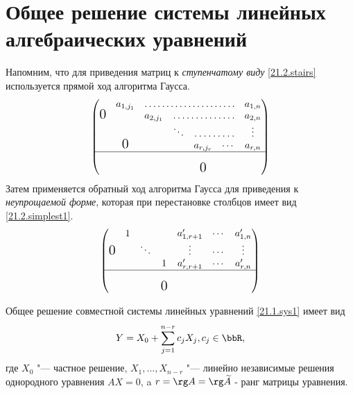 \section{Общее решение системы линейных алгебраических уравнений}
Напомним, что для приведения матриц к \textit{ступенчатому виду} \eqref{21.2.stairs} используется прямой ход алгоритма Гаусса. 
\begin{equation}\label{21.2.stairs} 
\begin{pmatrix}
  &a_{1,j_1}& \hdotsfor{4}          &a_{1,n}     \cr 
\fudge 0&&a_{2,j_1} &\hdotsfor{3}      &a_{2,n}     \cr
  &   &     &\ddots&\hdotsfor{2}    &\vdots      \cr 
  &\fudge 0 && & a_{r,j_r}  &\cdots &a_{r,n}   \cr \hline
  &   &     &  &            &       &         \cr
  &   &     &  &\fudge 0    &       &         \cr
\end{pmatrix}
\end{equation}    
Затем применяется обратный ход алгоритма Гаусса для приведения к \textit{неупрощаемой форме}, которая при перестановке столбцов имеет вид \eqref{21.2.simplest1}.
\begin{equation}\label{21.2.simplest1}
\begin{pmatrix}
  & 1 &     &   &a'_{1,r+1} &\cdots &a'_{1,n}   \cr 
\smash{\hbox{\Large0}} & &\ddots& &\vdots &\cdots &\vdots     \cr
  &   &     & 1 &a'_{r,r+1} &\cdots &a'_{r,n}   \cr \hline
  &   &     &   &           &       &           \cr
  &   & &\smash{\hbox{\Large0}}  &        &       &           \cr
\end{pmatrix}
\end{equation}    
\begin{thm}\label{21.2.th.common}
Общее решение совместной системы линейных уравнений \eqref{21.1.sys1} имеет вид 
\begin{equation}\label{21.2.common}
Y=X_0+\sum_{j=1}^{n-r}c_jX_j, c_j \in \bbR,
\end{equation}
где $X_0$ "--- частное решение, $X_1,...,X_{n-r}$ "--- линейно независимые решения однородного уравнения $AX=0$, a $r=\rg A=\rg \widetilde A$ - ранг матрицы уравнения.
\end{thm}
